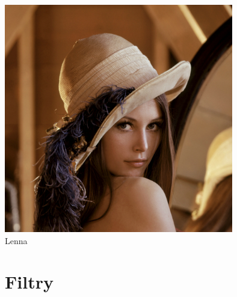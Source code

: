 \documentclass[a4paper,12pt,openany]{report}
\begin{document}
\begin{center}
\includegraphics[width=10cm]{resources/Lena.jpg}\\
\tiny{Lenna}
\end{center}













\chapter{Filtry}
\end{document}
